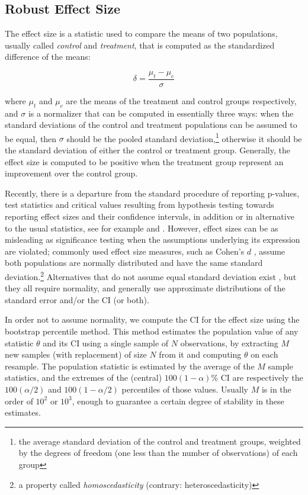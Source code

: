 \documentclass[a4paper,11pt]{kth-mag}
\begin{document}
\subsection{Robust Effect Size}
\label{sec:effect_size}
The effect size is a statistic used to compare the means of two populations, usually called \emph{control} and \emph{treatment}, that is computed as the standardized difference of the means:

\begin{equation}
\label{eq:base_es}
\delta=\frac{\mu_t-\mu_c}{\sigma}
\end{equation}

\noindent where $\mu_t$ and $\mu_c$ are the means of the treatment and control groups respectively, and $\sigma$ is a normalizer that can be computed in essentially three ways: when the standard deviations of the control and treatment populations can be assumed to be equal, then $\sigma$ should be the pooled standard deviation,\footnote{the average standard deviation of the control and treatment groups, weighted by the degrees of freedom (one less than the number of observations) of each group} otherwise it should be the standard deviation of either the control or treatment group. Generally, the effect size is computed to be positive when the treatment group represent an improvement over the control group.

Recently, there is a departure from the standard procedure of reporting p-values, test statistics and critical values resulting from hypothesis testing towards reporting effect sizes and their confidence intervals, in addition or in alternative to the usual statistics, see for example \cite{apa} and \cite{aera}.  However, effect sizes can be as misleading as significance testing when the assumptions underlying its expression are violated; commonly used effect size measures, such as Cohen's $d$ \citep{cohen1988spa}, assume both populations are normally distributed and have the same standard deviation.\footnote{a property called \emph{homoscedasticity} (contrary: heteroscedasticity)} Alternatives that do not assume equal standard deviation exist \citep{es1,es2,es3}, but they all require normality, and generally use approximate distributions of the standard error and/or the CI (or both).

In order not to assume normality, we compute the CI for the effect size using the bootstrap percentile method. This method estimates the population value of any statistic $\theta$ and its CI using a single sample of $N$ observations, by extracting $M$ new samples (with replacement) of size $N$ from it and computing $\theta$ on each resample. The population statistic is estimated by the average of the $M$ sample statistics, and the extremes of the (central) $100(1-\alpha)\%$ CI are respectively the $100(\alpha/2)$ and $100(1-\alpha/2)$ percentiles of those values. Usually $M$ is in the order of $10^2$ or $10^3$, enough to guarantee a certain degree of stability in these estimates.
\end{document}
